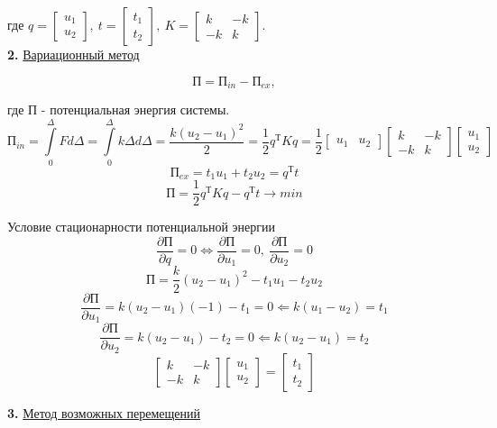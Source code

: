 	где $q = \begin{bmatrix}
		u_1 \\ u_2
	\end{bmatrix},\ t = \begin{bmatrix}
	t_1 \\ t_2
	\end{bmatrix}, \ K =	\begin{bmatrix}
	k & - k \\ -k & k
	\end{bmatrix}$.\\

\textbf{2.} \underline{Вариационный метод}

\[
\text{П} = \text{П}_{in} - \text{П}_{ex},
\]

где $\text{П}$ - потенциальная энергия системы. 
\[
\text{П}_{in} = \int\limits_0^{\Delta} Fd\Delta = \int\limits_0^{\Delta}k\Delta d\Delta = \frac{k(u_2-u_1)^2}{2}=\frac{1}{2}q^{\text{Т}}Kq=\frac{1}{2}\begin{bmatrix}
		u_1 & u_2
	\end{bmatrix}\begin{bmatrix}
	k & - k \\ -k & k
	\end{bmatrix}
	\begin{bmatrix}
	u_1 \\ u_2
	\end{bmatrix}
\]
\[
\text{П}_{ex} =  t_1 u_1 +t_2 u_2 = q^{\text{Т}}t
\]
\[
\text{П} = \frac{1}{2}q^{\text{Т}}Kq-q^{\text{Т}}t\rightarrow min
\]

Условие стационарности потенциальной энергии
\[
\frac{\partial \text{П}}{\partial q}=0 \Leftrightarrow \frac{\partial \text{П}}{\partial u_1}=0, \ \frac{\partial \text{П}}{\partial u_2}=0
\]
\[
\text{П}=\frac{k}{2}(u_2-u_1)^2-t_1u_1-t_2u_2
\]
\[
\frac{\partial \text{П}}{\partial u_1}=k(u_2-u_1)(-1)-t_1=0 \Leftarrow k(u_1-u_2)= t_1
\]
\[
\frac{\partial \text{П}}{\partial u_2}=k(u_2-u_1)-t_2=0 \Leftarrow k(u_2-u_1)= t_2
\]
\[
\begin{bmatrix}
	k & - k \\ -k & k
\end{bmatrix}
\begin{bmatrix}
	u_1 \\ u_2
\end{bmatrix} = \begin{bmatrix}
	t_1 \\ t_2
\end{bmatrix} 
\]

\textbf{3.} \underline{Метод возможных перемещений}

